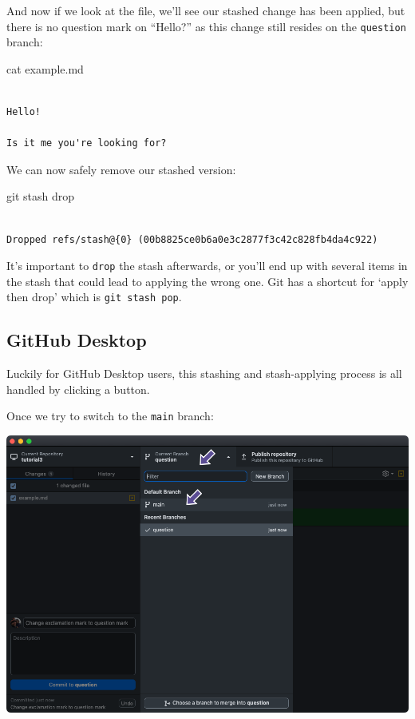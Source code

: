 \documentclass[
  letterpaper,
  DIV=11,
  numbers=noendperiod]{scrartcl}
\newenvironment{Shaded}{\begin{snugshade}}{\end{snugshade}}
\newcommand{\FunctionTok}[1]{\textcolor[rgb]{0.28,0.35,0.67}{#1}}
\newcommand{\NormalTok}[1]{\textcolor[rgb]{0.00,0.23,0.31}{#1}}
\begin{document}
And now if we look at the file, we'll see our stashed change has been
applied, but there is no question mark on ``Hello?'' as this change
still resides on the \texttt{question} branch:

\begin{Shaded}
\begin{Highlighting}[]
\FunctionTok{cat}\NormalTok{ example.md}
\end{Highlighting}
\end{Shaded}

\begin{verbatim}

Hello!

Is it me you're looking for?
\end{verbatim}

We can now safely remove our stashed version:

\begin{Shaded}
\begin{Highlighting}[]
\FunctionTok{git}\NormalTok{ stash drop}
\end{Highlighting}
\end{Shaded}

\begin{verbatim}

Dropped refs/stash@{0} (00b8825ce0b6a0e3c2877f3c42c828fb4da4c922)
\end{verbatim}

It's important to \texttt{drop} the stash afterwards, or you'll end up
with several items in the stash that could lead to applying the wrong
one. Git has a shortcut for `apply then drop' which is
\texttt{git\ stash\ pop}.

\subsection{GitHub Desktop}

Luckily for GitHub Desktop users, this stashing and stash-applying
process is all handled by clicking a button.

Once we try to switch to the \texttt{main} branch:

\includegraphics{images/image39.png}
\end{document}
